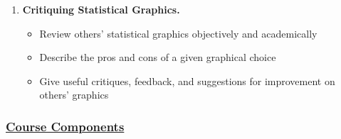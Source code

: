 \documentclass[11pt]{article}
\begin{document}
\begin{enumerate}
\item {\bf Critiquing Statistical Graphics.}
\begin{itemize}
	\item Review others' statistical graphics objectively and academically
	\item Describe the pros and cons of a given graphical choice
	\item Give useful critiques, feedback, and suggestions for improvement on others' graphics
\end{itemize}

\end{enumerate}

\vspace*{3mm}

\subsubsection*{\underline{Course Components}}
\end{document}
